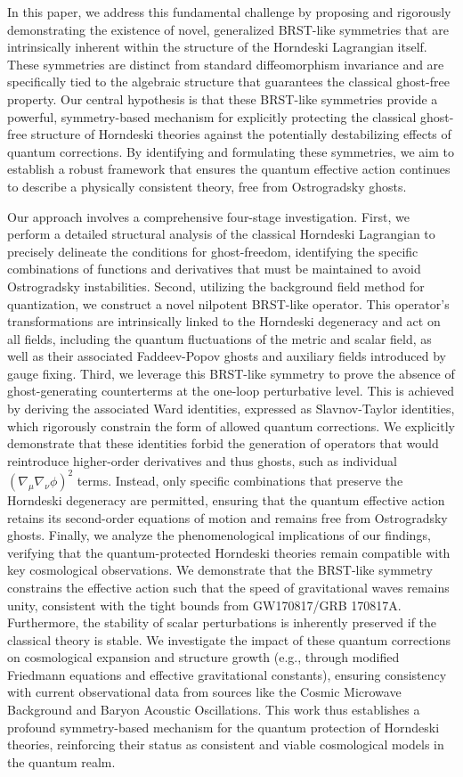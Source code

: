 \documentclass[twocolumn]{aastex631}
\begin{document}
In this paper, we address this fundamental challenge by proposing and rigorously demonstrating the existence of novel, generalized BRST-like symmetries that are intrinsically inherent within the structure of the Horndeski Lagrangian itself. These symmetries are distinct from standard diffeomorphism invariance and are specifically tied to the algebraic structure that guarantees the classical ghost-free property. Our central hypothesis is that these BRST-like symmetries provide a powerful, symmetry-based mechanism for explicitly protecting the classical ghost-free structure of Horndeski theories against the potentially destabilizing effects of quantum corrections. By identifying and formulating these symmetries, we aim to establish a robust framework that ensures the quantum effective action continues to describe a physically consistent theory, free from Ostrogradsky ghosts.

Our approach involves a comprehensive four-stage investigation. First, we perform a detailed structural analysis of the classical Horndeski Lagrangian to precisely delineate the conditions for ghost-freedom, identifying the specific combinations of functions and derivatives that must be maintained to avoid Ostrogradsky instabilities. Second, utilizing the background field method for quantization, we construct a novel nilpotent BRST-like operator. This operator's transformations are intrinsically linked to the Horndeski degeneracy and act on all fields, including the quantum fluctuations of the metric and scalar field, as well as their associated Faddeev-Popov ghosts and auxiliary fields introduced by gauge fixing. Third, we leverage this BRST-like symmetry to prove the absence of ghost-generating counterterms at the one-loop perturbative level. This is achieved by deriving the associated Ward identities, expressed as Slavnov-Taylor identities, which rigorously constrain the form of allowed quantum corrections. We explicitly demonstrate that these identities forbid the generation of operators that would reintroduce higher-order derivatives and thus ghosts, such as individual $(\nabla_\mu\nabla_\nu\phi)^2$ terms. Instead, only specific combinations that preserve the Horndeski degeneracy are permitted, ensuring that the quantum effective action retains its second-order equations of motion and remains free from Ostrogradsky ghosts. Finally, we analyze the phenomenological implications of our findings, verifying that the quantum-protected Horndeski theories remain compatible with key cosmological observations. We demonstrate that the BRST-like symmetry constrains the effective action such that the speed of gravitational waves remains unity, consistent with the tight bounds from GW170817/GRB 170817A. Furthermore, the stability of scalar perturbations is inherently preserved if the classical theory is stable. We investigate the impact of these quantum corrections on cosmological expansion and structure growth (e.g., through modified Friedmann equations and effective gravitational constants), ensuring consistency with current observational data from sources like the Cosmic Microwave Background and Baryon Acoustic Oscillations. This work thus establishes a profound symmetry-based mechanism for the quantum protection of Horndeski theories, reinforcing their status as consistent and viable cosmological models in the quantum realm.
\end{document}

